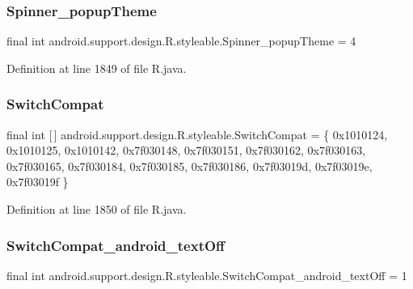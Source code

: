 \subsubsection{\texorpdfstring{Spinner\_popupTheme}{Spinner\_popupTheme}}
{\footnotesize\ttfamily final int android.\+support.\+design.\+R.\+styleable.\+Spinner\+\_\+popup\+Theme = 4\hspace{0.3cm}{\ttfamily [static]}}



Definition at line 1849 of file R.\+java.

\mbox{\label{classandroid_1_1support_1_1design_1_1_r_1_1styleable_a7389a923bf3e321b6b5d10b0589547a1}} 
\subsubsection{\texorpdfstring{SwitchCompat}{SwitchCompat}}
{\footnotesize\ttfamily final int \mbox{[}$\,$\mbox{]} android.\+support.\+design.\+R.\+styleable.\+Switch\+Compat = \{ 0x1010124, 0x1010125, 0x1010142, 0x7f030148, 0x7f030151, 0x7f030162, 0x7f030163, 0x7f030165, 0x7f030184, 0x7f030185, 0x7f030186, 0x7f03019d, 0x7f03019e, 0x7f03019f \}\hspace{0.3cm}{\ttfamily [static]}}



Definition at line 1850 of file R.\+java.

\mbox{\label{classandroid_1_1support_1_1design_1_1_r_1_1styleable_a837987a3c039d6ff4cbd72571612d0ee}} 
\subsubsection{\texorpdfstring{SwitchCompat\_android\_textOff}{SwitchCompat\_android\_textOff}}
{\footnotesize\ttfamily final int android.\+support.\+design.\+R.\+styleable.\+Switch\+Compat\+\_\+android\+\_\+text\+Off = 1\hspace{0.3cm}{\ttfamily [static]}}



